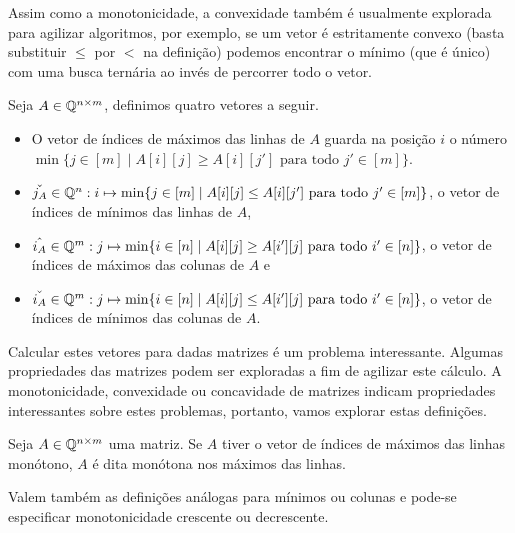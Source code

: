 Assim como a monotonicidade, a convexidade também é usualmente explorada para agilizar algoritmos, por exemplo, se um vetor é estritamente convexo (basta substituir $\leq$ por $<$ na definição) podemos encontrar o mínimo (que é único) com uma busca ternária ao invés de percorrer todo o vetor.  

\begin{defi}
Seja $A \in \mathbb{Q}^{n \times m}$, definimos quatro vetores a seguir.
    \begin{itemize}
        \item O vetor de índices de máximos das linhas de $A$ guarda na posição $i$ 
              o número $\min\{j \in [m] \mid A[i][j] \geq A[i][j'] \text{ para todo } j' \in [m]\}$. 
        \item $\check{j_A} \in \mathbb{Q}^n : i \mapsto \min\{j \in [m] \mid A[i][j] \leq A[i][j'] \text{ para todo } j' \in [m]\}$, o vetor de índices de mínimos das linhas de $A$,
        \item $\hat{i_A} \in \mathbb{Q}^m : j \mapsto \min\{i \in [n] \mid A[i][j] \geq A[i'][j] \text{ para todo } i' \in [n]\}$, o vetor de índices de máximos das colunas de $A$ e 
        \item $\check{i_A} \in \mathbb{Q}^m : j \mapsto \min\{i \in [n] \mid A[i][j] \leq A[i'][j] \text{ para todo } i' \in [n]\}$, o vetor de índices de mínimos das colunas de $A$.
    \end{itemize}
\end{defi}

Calcular estes vetores para dadas matrizes é um problema interessante. Algumas propriedades das matrizes podem ser exploradas a fim de agilizar este cálculo. A monotonicidade, convexidade ou concavidade de matrizes indicam propriedades interessantes sobre estes problemas, portanto, vamos explorar estas definições.

\begin{defi}
Seja $A \in \mathbb{Q}^{n \times m}$ uma matriz. Se $A$ tiver o vetor de índices de máximos das linhas monótono, $A$ é dita monótona nos máximos das linhas. 

Valem também as definições análogas para mínimos ou colunas e pode-se especificar monotonicidade crescente ou decrescente.
\end{defi}

